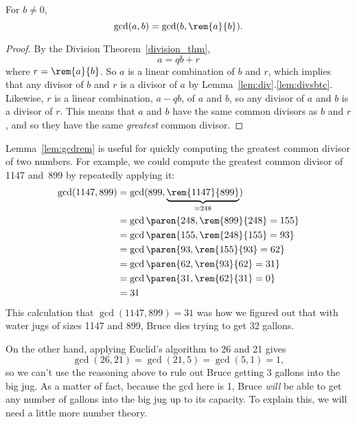\begin{lemma}\label{lem:gcdrem}
For $b \neq 0$,
\[
\gcd(a, b) = \gcd(b, \rem{a}{b}).
\]

\begin{proof}
By the Division Theorem~\ref{division_thm},
\begin{equation}\label{aqbrprf}
a = qb + r
\end{equation}
where $r = \rem{a}{b}$.  So $a$ is a linear combination of $b$ and
$r$, which implies that any divisor of $b$ and $r$ is a divisor of $a$
by Lemma~\ref{lem:div}.\ref{lem:divsbtc}.  Likewise, $r$ is a linear
combination, $a-qb$, of $a$ and $b$, so any divisor of $a$ and $b$ is
a divisor of $r$.  This means that $a$ and $b$ have the same common
divisors as $b$ and $r$, and so they have the same \emph{greatest}
common divisor.
\end{proof}
\end{lemma}

Lemma~\ref{lem:gcdrem} is useful for quickly computing the greatest
common divisor of two numbers.  For example, we could compute the
greatest common divisor of 1147 and~899 by repeatedly applying it:
\begin{align*}
\gcd(1147, 899) &= \gcd(899, \underbrace{\rem{1147}{899}}_{{} = 248}) \\
&= \gcd\paren{248, \rem{899}{248} = 155} \\
&= \gcd\paren{155, \rem{248}{155} = 93} \\
&= \gcd\paren{ 93, \rem{155}{93} = 62}\\
&= \gcd\paren{ 62, \rem{93}{62} = 31} \\
&= \gcd\paren{ 31, \rem{62}{31} = 0} \\
&= 31
\end{align*}
This calculation that $\gcd(1147, 899) = 31$ was how we figured out
that with water jugs of sizes 1147 and 899, Bruce dies trying to get
32 gallons.

On the other hand, applying Euclid's algorithm to 26 and 21 gives
\[
\gcd(26, 21) = \gcd(21, 5) = \gcd(5, 1) = 1,
\]
so we can't use the reasoning above to rule out Bruce getting 3
gallons into the big jug.  As a matter of fact, because the gcd here
is 1, Bruce \emph{will} be able to get any number of gallons into the big jug
up to its capacity.  To explain this, we will need a little more
number theory.

